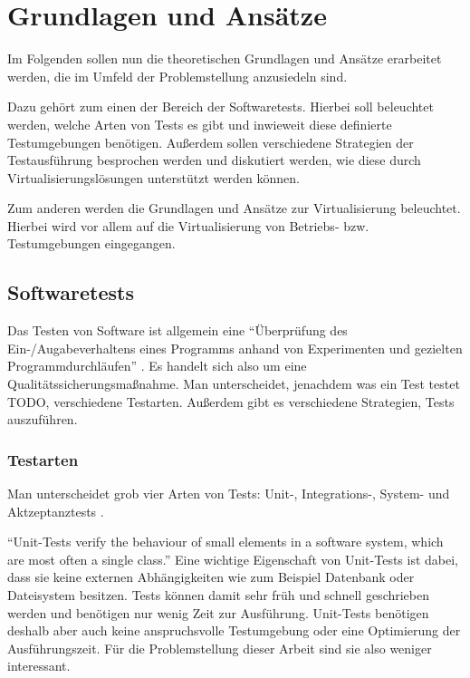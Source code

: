 \section{Grundlagen und Ansätze}

Im Folgenden sollen nun die theoretischen Grundlagen und Ansätze erarbeitet werden, die im Umfeld der Problemstellung anzusiedeln sind.

Dazu gehört zum einen der Bereich der Softwaretests. Hierbei soll beleuchtet werden, welche Arten von Tests es gibt und inwieweit diese definierte Testumgebungen benötigen. Außerdem sollen verschiedene Strategien der Testausführung besprochen werden und diskutiert werden, wie diese durch Virtualisierungslösungen unterstützt werden können.

Zum anderen werden die Grundlagen und Ansätze zur Virtualisierung beleuchtet. Hierbei wird vor allem auf die Virtualisierung von Betriebs- bzw. Testumgebungen eingegangen.

\subsection{Softwaretests}

Das Testen von Software ist allgemein eine "`Überprüfung des Ein-/Augabeverhaltens eines Programms anhand von Experimenten und gezielten Programmdurchläufen"' \citep[S.][S.662]{itduden}. Es handelt sich also um eine Qualitätssicherungsmaßnahme. Man unterscheidet, jenachdem was ein Test testet TODO, verschiedene Testarten. Außerdem gibt es verschiedene Strategien, Tests auszuführen.

\subsubsection{Testarten}

Man unterscheidet grob vier Arten von Tests: Unit-, Integrations-, System- und Aktzeptanztests \citep[Vgl.][S. 129 ff]{DuvMatAnd07}.


"`Unit-Tests verify the behaviour of small elements in a software system, which are most often a single class."' \citep[S.][S. 132]{DuvMatAnd07} Eine wichtige Eigenschaft von Unit-Tests ist dabei, dass sie keine externen Abhängigkeiten wie zum Beispiel Datenbank oder Dateisystem besitzen. Tests können damit sehr früh und schnell geschrieben werden und benötigen nur wenig Zeit zur Ausführung. \citep[Vgl.][S. 133]{DuvMatAnd07} Unit-Tests benötigen deshalb aber auch keine anspruchsvolle Testumgebung oder eine Optimierung der Ausführungszeit. Für die Problemstellung dieser Arbeit sind sie also weniger interessant.


